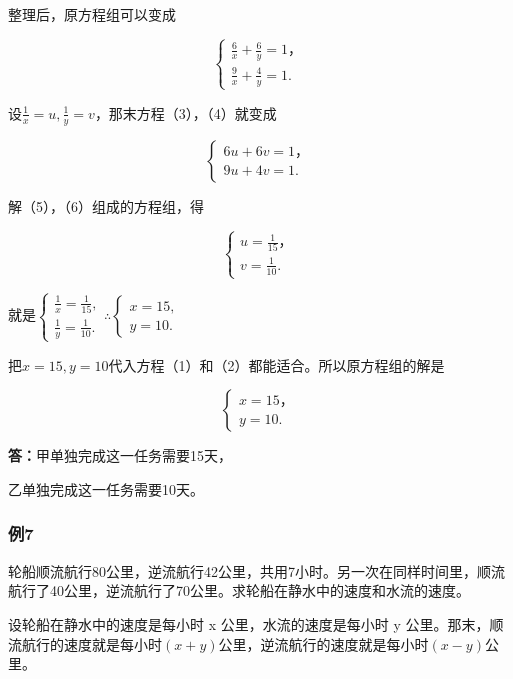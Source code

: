 整理后，原方程组可以变成

\[
\left\{ \begin{array}{l} \frac{6}{x} + \frac{6}{y} = 1\text{，} \\ \frac{9}{x} + \frac{4}{y} = 1. \end{array} \right. \tag{3}
\]

设\(\frac{1}{x} = u, \frac{1}{y} = v\)，那末方程（3），（4）就变成

\[
\left\{ \begin{array}{l} 6 u + 6 v = 1\text{，} \\ 9 u + 4 v = 1. \end{array} \right. \tag{5}
\]

解（5），（6）组成的方程组，得

\[
\left\{ \begin{array}{l} u = \frac{1}{15}\text{，} \\ v = \frac{1}{10}. \end{array} \right.
\]

就是\(\left\{ \begin{array}{l} \frac{1}{x} = \frac{1}{15}, \\ \frac{1}{y} = \frac{1}{10}. \end{array} \right.\therefore \left\{ \begin{array}{l} x = 15, \\ y = 10. \end{array} \right.\)

把\(x = 15, y = 10\)代入方程（1）和（2）都能适合。所以原方程组的解是

\[
\left\{ \begin{array}{l} x = 15\text{，} \\ y = 10. \end{array} \right.
\]

\textbf{答：}甲单独完成这一任务需要15天，

乙单独完成这一任务需要10天。

\subsubsection{例7}

轮船顺流航行80公里，逆流航行42公里，共用7小时。另一次在同样时间里，顺流航行了40公里，逆流航行了70公里。求轮船在静水中的速度和水流的速度。

 设轮船在静水中的速度是每小时 x 公里，水流的速度是每小时
y
公里。那末，顺流航行的速度就是每小时\((x+y)\)公里，逆流航行的速度就是每小时\((x-y)\)公里。

